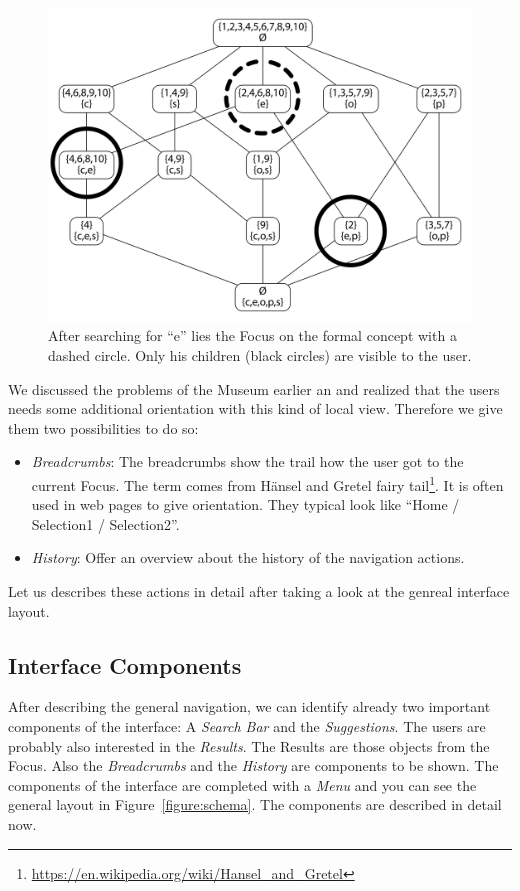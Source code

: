 \documentclass[11pt]{report}
\begin{document}
\begin{figure}[!ht]
	\centering
	\includegraphics[width=\linewidth]{images/focus}
\caption{After searching for ``e'' lies the Focus on the formal concept with a dashed circle. Only his children (black circles) are visible to the user. }
\label{figure:conceptExample}
\end{figure}

We discussed the problems of the Museum earlier an and realized that the users needs some additional orientation with this kind of local view. Therefore we give them two possibilities to do so:
\begin{itemize}
	\item \textit{Breadcrumbs}: The breadcrumbs show the trail how the user got to the current Focus. The term comes from Hänsel and Gretel fairy tail\footnote{\url{https://en.wikipedia.org/wiki/Hansel_and_Gretel}}. It is often used in web pages to give orientation. They typical look like ``Home / Selection1 / Selection2''.
	\item \textit{History}: Offer an overview about the history of the navigation actions.
\end{itemize}

Let us describes these actions in detail after taking a look at the genreal interface layout.

\subsection{Interface Components}
After describing the general navigation, we can identify already two important components of the interface: A \textit{Search Bar} and the \textit{Suggestions}. The users are probably also interested in the \textit{Results}. The Results are those objects from the Focus. Also the \textit{Breadcrumbs} and the \textit{History} are components to be shown. The components of the interface are completed with a \textit{Menu} and you can see the general layout in Figure~\ref{figure:schema}. The components are described in detail now. \\
\end{document}
